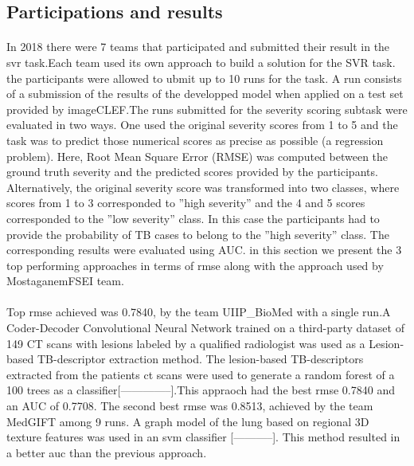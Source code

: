 \subsection{Participations and results}
\paragraph{}
In 2018 there were 7 teams that participated and submitted their result in the \acs{svr} task.Each team used its own approach to build a solution for the SVR task. the participants were allowed to ubmit up to 10 runs for the task. A run consists of a submission of the results of the developped model when applied on a test set provided by imageCLEF.The runs submitted for the severity scoring subtask were evaluated in two ways. One used the original severity scores from 1 to 5 and the task was to predict those numerical scores as precise as possible (a regression problem). Here, Root Mean Square Error (RMSE) was computed between the ground truth severity and the predicted scores provided by the participants. Alternatively, the original severity score was transformed into two classes, where scores from 1 to 3 corresponded to ”high severity” and the 4 and 5 scores corresponded to the ”low severity” class. In this case the participants had to provide the probability of TB cases to belong to the ”high severity” class. The corresponding results were evaluated using AUC. in this section we present the 3 top performing approaches in terms of \ac{rmse} along with the approach used by MostaganemFSEI team.
\paragraph{}
Top \acs{rmse} achieved was 0.7840, by the team UIIP\_BioMed with a single run.A Coder-Decoder Convolutional Neural Network trained on a third-party dataset of 149 CT scans with lesions labeled by a qualified radiologist was used as a Lesion-based TB-descriptor extraction method. The lesion-based TB-descriptors extracted from the patients \acs{ct} scans were used to generate a random forest of a 100 trees as a classifier[--------------].This appraoch had the best \acs{rmse} 0.7840 and an AUC of 0.7708. The second best \acs{rmse} was 0.8513, achieved by the team MedGIFT among 9 runs. A graph model of the lung based on regional 3D texture features was used in an \acs{svm} classifier [-----------]. This method resulted in a better \acs{auc} than the previous approach.
